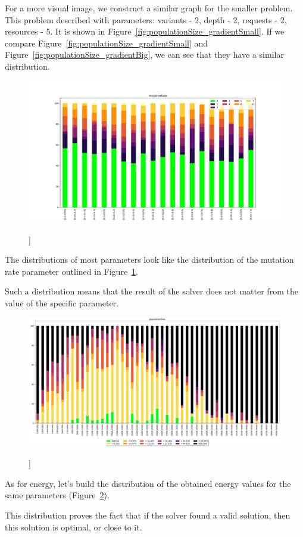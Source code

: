 For a more visual image, we construct a similar graph for the smaller problem. This problem described with parameters: variants - 2, depth - 2, requests - 2, resources - 5.
It is shown in Figure~\ref{fig:populationSize_gradientSmall}. If we compare Figure~\ref{fig:populationSize_gradientSmall} and Figure~\ref{fig:populationSize_gradientBig}, we can see that they have a similar distribution.

\begin{figure}
	\centering
	\includegraphics[width=\textwidth]{images/mutationRate_gradient_500dpi.png}
	\caption[]]{}
	\label{fig:mutationRate_gradient}
\end{figure}

The distributions of most parameters look like the distribution of the mutation rate parameter outlined in Figure~\ref{fig:mutationRate_gradient}.

Such a distribution means that the result of the solver does not matter from the value of the specific parameter.

\begin{figure}
	\centering
	\includegraphics[width=\textwidth]{images/populationSizeObjective.pdf}
	\caption[]]{}
	\label{fig:populationSizeObjective}
\end{figure}

As for energy, let's build the distribution of the obtained energy values for the same parameters (Figure~\ref{fig:populationSizeObjective}).

This distribution proves the fact that if the solver found a valid solution, then this solution is optimal, or close to it.